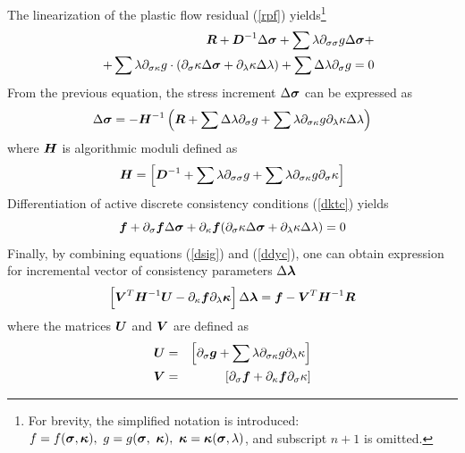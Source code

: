 \documentclass[a4paper]{article}
\newcommand{\mbf}[1]{\mbox{\boldmath$#1$}}
\newcommand{\sig}{\mbf{\sigma}}
\begin{document}
The linearization of the plastic flow residual (\ref{rpf}) yields\footnote{For brevity, the simplified notation is introduced: $f=f(\sig,\mbf{\kappa}),\  g=g(\sig,\  \mbf{\kappa}),\  \mbf{\kappa}=\mbf{\kappa}(\sig,\lambda)$, and subscript $n+1$ is omitted.}
\begin{eqnarray}
\nonumber
&&\mbf{R}+\mbf{D}^{-1}\Delta\sig+\sum\lambda\partial_{\sigma\sigma}g\Delta\sig+\\
&&+\sum\lambda\partial_{\sigma\kappa}g\cdot(\partial_\sigma\kappa\Delta\sig+\partial_\lambda\kappa\Delta\lambda)+\sum\Delta\lambda\partial_{\sigma}g =0
\end{eqnarray}
From the previous equation, the stress increment $\Delta\sig$ can be expressed as
\begin{equation}
\label{dsig}
\Delta\sig=-\mbf{H}^{-1}\left(\mbf{R}+\sum\Delta\lambda\partial_{\sigma}g+\sum\lambda\partial_{\sigma\kappa}g\partial_{\lambda}\kappa\Delta\lambda\right)
\end{equation}
where $\mbf{H}$ is algorithmic moduli defined as
\begin{equation}
\mbf{H}=\left[\mbf{D}^{-1}+\sum\lambda\partial_{\sigma\sigma}g+\sum\lambda\partial_{\sigma\kappa}g\partial_{\sigma}\kappa\right]
\end{equation}
Differentiation of active discrete consistency conditions (\ref{dktc}) yields
\begin{equation}
\label{ddyc}
\mbf{f}+\partial_{\sigma}\mbf{f}\Delta\sig+\partial_{\kappa}\mbf{f} (\partial_\sigma\kappa\Delta\sig+\partial_\lambda\kappa\Delta\lambda) =0
\end{equation}
Finally, by combining equations (\ref{dsig}) and (\ref{ddyc}), one can obtain expression for incremental vector of consistency parameters $\Delta\mbf{\lambda}$
\begin{equation}
\left[\mbf{V}^T\mbf{H}^{-1}\mbf{U}-\partial_{\kappa}\mbf{f}\partial_{\lambda}\mbf{\kappa}\right]\Delta\mbf{\lambda}=\mbf{f}-\mbf{V}^T\mbf{H}^{-1}\mbf{R}
\end{equation}
where the matrices $\mbf{U}$ and $\mbf{V}$ are defined as
\begin{eqnarray}
\mbf{U} &=& \left[\partial_{\sigma}\mbf{g}+\sum\lambda\partial_{\sigma\kappa}g\partial_{\lambda}\kappa\right]\\
\mbf{V} &=& \left[\partial_{\sigma}\mbf{f}+\partial_{\kappa}\mbf{f}\partial_{\sigma}\kappa\right]
\end{eqnarray}
\end{document}

